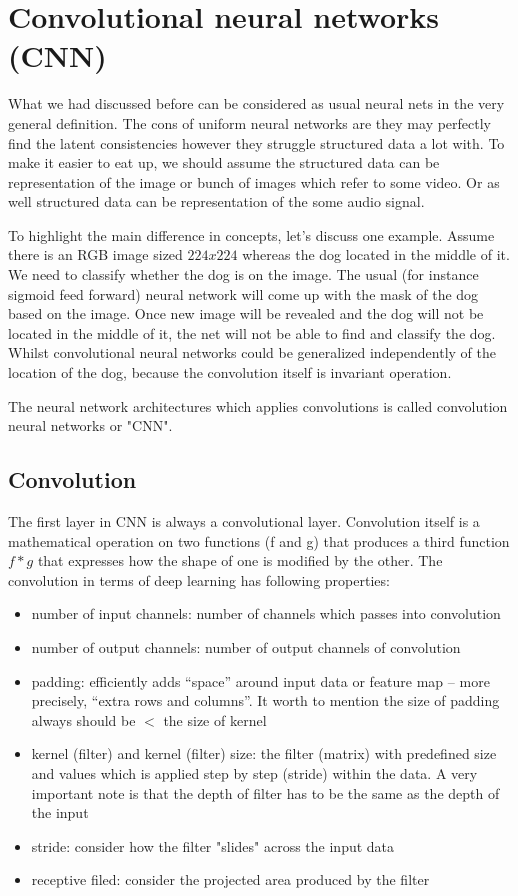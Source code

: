 \section{Convolutional neural networks (CNN)}
What we had discussed before can be considered as usual neural nets in the very general definition. The cons of uniform neural networks are they may perfectly find the latent consistencies however they struggle structured data a lot with. To make it easier to eat up, we should assume the structured data can be representation of the image or bunch of images which refer to some video. Or as well structured data can be representation of the some audio signal.

To highlight the main difference in concepts, let's discuss one example.
Assume there is an RGB image sized $224x224$ whereas the dog located in the middle of it. We need to classify whether the dog is on the image. The usual (for instance sigmoid feed forward) neural network will come up with the mask of the dog based on the image. Once new image will be revealed and the dog will not be located in the middle of it, the net will not be able to find and classify the dog. Whilst convolutional neural networks could be generalized independently of the location of the dog, because the convolution itself is invariant operation.         

The neural network architectures which applies convolutions is called convolution neural networks or "CNN".    

\subsection{Convolution}
The first layer in CNN is always a convolutional layer. Convolution itself is a mathematical operation on two functions (f and g) that produces a third function $f*g$ that expresses how the shape of one is modified by the other. The convolution in terms of deep learning has following properties:  
\begin{itemize}
    \item number of input channels: number of channels which passes into convolution 
    \item number of output channels: number of output channels of convolution
    \item padding: efficiently adds “space” around input data or feature map – more precisely, “extra rows and columns”. It worth to mention the size of padding always should be $<$ the size of kernel 
    \item kernel (filter) and kernel (filter) size: the filter (matrix) with predefined size and values which is applied step by step (stride) within the data. A very important note is that the depth of filter has to be the same as the depth of the input
    \item stride: consider how the filter "slides" across the input data
    \item receptive filed: consider the projected area produced by the filter
\end{itemize}

